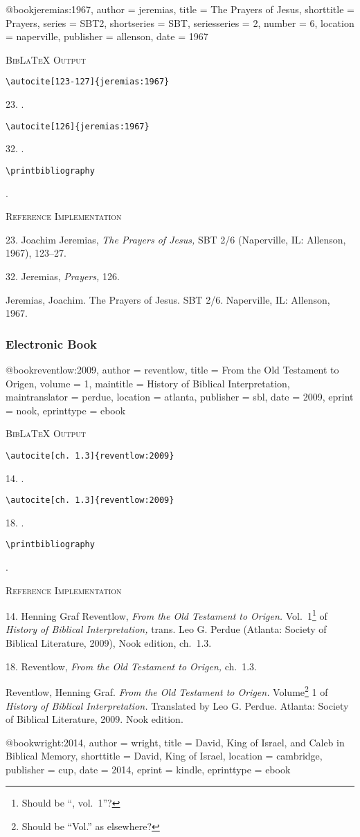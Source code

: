 \documentclass[a4paper]{article}
\newcommand\citetest[5]{%
  {\textsc{BibLaTeX Output}\par
   \nobreak
   \texttt{\textbackslash autocite[#2]\{#5\}}\par
   \color{biblatex-colour}
   #1. \cite[#2]{#5}.\par
   \color{black}
   \texttt{\textbackslash autocite[#4]\{#5\}}\par
   \color{biblatex-colour}
   #3. \cite[#4]{#5}.\par
   \color{black}
   \texttt{\textbackslash printbibliography}\par
   \color{biblatex-colour}
   \hangindent\bibindent\bibentrycite{#5}.\par}}
\newenvironment{refimp}{%
  \begin{minipage}{\linewidth}
    \setlength{\parskip}{1ex}
    \textsc{Reference Implementation}\par
    \nobreak
    \color{reference-colour}
}{\end{minipage}}
\newenvironment{vb}{%
  \setlength{\parskip}{0pt}
  \verbatim}{\endverbatim}
\begin{document}
\begin{vb}
@book{jeremias:1967,
  author = jeremias,
  title = {The Prayers of Jesus},
  shorttitle = {Prayers},
  series = SBT2,
  shortseries = {SBT},
  seriesseries = {2},
  number = {6},
  location = naperville,
  publisher = allenson,
  date = {1967}
}
\end{vb}

\citetest{23}{123-127}{32}{126}{jeremias:1967}

\begin{refimp}
  23. Joachim Jeremias, \emph{The Prayers of Jesus,} SBT 2/6 (Naperville, IL:
  Allenson, 1967), 123–27.

  32. Jeremias, \emph{Prayers,} 126.

  \hangindent\bibindent Jeremias, Joachim. The Prayers of Jesus. SBT 2/6.
  Naperville, IL: Allenson, 1967.
\end{refimp}

\subsubsection{Electronic Book}

\begin{vb}
@book{reventlow:2009,
  author = reventlow,
  title = {From the Old Testament to Origen},
  volume = {1},
  maintitle = {History of Biblical Interpretation},
  maintranslator = perdue,
  location = atlanta,
  publisher = sbl,
  date = 2009,
  eprint = nook,
  eprinttype = {ebook}
}
\end{vb}

\citetest{14}{ch.~1.3}{18}{ch.~1.3}{reventlow:2009}

\begin{refimp}
  14. Henning Graf Reventlow, \emph{From the Old Testament to Origen.}
  Vol.~1\footnote{Should be “, vol.~1”?} of \emph{History of Biblical
  Interpretation,} trans. Leo G. Perdue (Atlanta: Society of Biblical
  Literature, 2009), Nook edition, ch.~1.3.

  18. Reventlow, \emph{From the Old Testament to Origen,} ch.~1.3.
  
  \hangindent\bibindent Reventlow, Henning Graf. \emph{From the Old Testament
  to Origen.} Volume\footnote{Should be “Vol.” as elsewhere?} 1 of
  \emph{History of Biblical Interpretation.} Translated by Leo G. Perdue.
  Atlanta: Society of Biblical Literature, 2009. Nook edition.
\end{refimp}

\begin{vb}
@book{wright:2014,
  author = wright,
  title = {David, King of Israel, and Caleb in Biblical Memory},
  shorttitle = {David, King of Israel},
  location = cambridge,
  publisher = cup,
  date = {2014},
  eprint = kindle,
  eprinttype = {ebook}
}
\end{vb}
\end{document}
